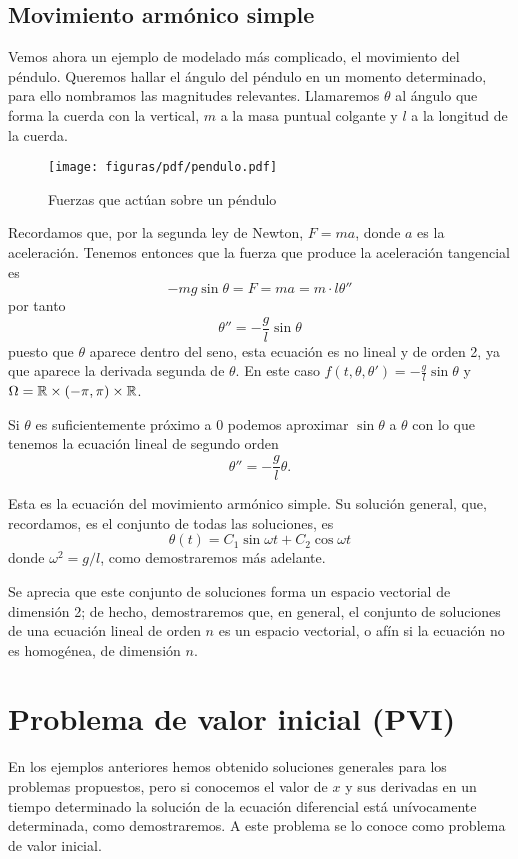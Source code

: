 \documentclass[../ecuaciones_diferenciales.tex]{subfiles}
\begin{document}
\subsection{Movimiento armónico simple}

Vemos ahora un ejemplo de modelado más complicado, el movimiento del péndulo.
Queremos hallar el ángulo del péndulo en un momento determinado, para ello
nombramos las magnitudes relevantes. Llamaremos \(\theta\) al ángulo que forma
la cuerda con la vertical, \(m\) a la masa puntual colgante y \(l\) a la
longitud de la cuerda.

\begin{figure}[ht]
	\centering
	\texttt{[image: figuras/pdf/pendulo.pdf]}
	\caption{Fuerzas que actúan sobre un péndulo}\label{fig:pendulo}
\end{figure}

Recordamos que, por la segunda ley de Newton, \(F = ma\), donde \(a\) es la
aceleración. Tenemos entonces que la fuerza que produce la aceleración
tangencial es
\[-m g \sin\theta = F = ma = m \cdot l \theta''\]
por tanto
\[\theta'' = -\frac{g}{l} \sin\theta\]
puesto que \(\theta\) aparece dentro del seno, esta ecuación es no lineal y de
orden 2, ya que aparece la derivada segunda de \(\theta\). En este caso
\(f(t, \theta, \theta') = -\frac{g}{l} \sin\theta\) y \(\Omega = \mathbb{R} \times
(-\pi, \pi) \times \mathbb{R}\).

Si \(\theta\) es suficientemente próximo a \(0\) podemos aproximar
\(\sin\theta\) a \(\theta\) con lo que tenemos la ecuación
lineal de segundo orden
\[\theta'' = -\frac{g}{l}\theta.\]

Esta es la ecuación del movimiento armónico simple. Su solución general, que,
recordamos, es el conjunto de todas las soluciones, es
\[\theta(t) = C_1 \sin \omega t + C_2 \cos \omega t\]
donde \(\omega^2 = g/l\), como demostraremos más adelante.

Se aprecia que este conjunto de soluciones forma un espacio vectorial de
dimensión 2; de hecho, demostraremos que, en general, el conjunto de soluciones
de una ecuación lineal de orden \(n\) es un espacio vectorial, o afín si la
ecuación no es homogénea, de dimensión \(n\).

\section{Problema de valor inicial (PVI)}

En los ejemplos anteriores hemos obtenido soluciones generales para los
problemas propuestos, pero si conocemos el valor de \(x\) y sus derivadas en un
tiempo determinado la solución de la ecuación diferencial está
unívocamente determinada, como demostraremos. A este problema se lo conoce como
problema de valor inicial.
\end{document}

